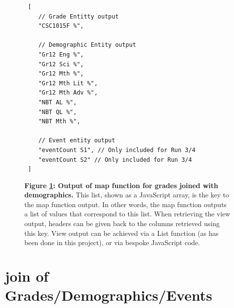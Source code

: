 \begin{figure}[ht]
    \centering
    \begin{verbatim}
 [
    // Grade Entitty output
    "CSC1015F %",

    // Demographic Entity output
    "Gr12 Eng %", 
    "Gr12 Sci %",
    "Gr12 Mth %",
    "Gr12 Mth Lit %",
    "Gr12 Mth Adv %",
    "NBT AL %",
    "NBT QL %",
    "NBT Mth %",

    // Event entity output
    "eventCount S1", // Only included for Run 3/4
    "eventCount S2" // Only included for Run 3/4
 ]    
    \end{verbatim}
    \caption[2-way-join map output]{\textbf{Figure \ref{grades-join-demographics-output}: Output of map function for grades joined with demographics.} This list, shown as a JavaScript array, is the key to the map function output. In other words, the map function outputs a list of values that correspond to this list. When retrieving the view output, headers can be given back to the columns retrieved using this key. View output can be achieved via a List function (as has been done in this project), or via bespoke JavaScript code.}
    \label{grades-join-demographics-output}
\end{figure}



\section{join of Grades/Demographics/Events}


